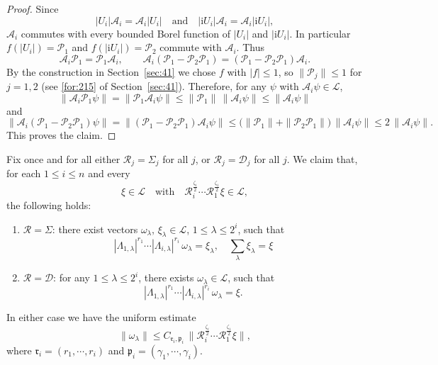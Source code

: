\documentclass[11 pt]{amsart}
\theoremstyle{definition}
\numberwithin{equation}{section}
\begin{document}
\begin{proof} Since
\[
  |U_i|\mathcal A_i = \mathcal A_i |U_i|\quad\text{and}\quad  |\textrm{i}U_i|\mathcal A_i = \mathcal A_i |\textrm{i}U_i|,
\]
$\mathcal A_i$ commutes with every bounded Borel function of $|U_i|$ and $|\textrm{i}U_i|$. In particular $f(|U_i|)=\mathcal P_1$ and $f(|\textrm{i}U_i|)=\mathcal P_2$ commute with $\mathcal A_i$.
Thus
\[
  \mathcal A_i\mathcal{P}_1 = \mathcal{P}_1\mathcal A_i,
  \qquad
  \mathcal A_i(\mathcal{P}_1-\mathcal{P}_2\mathcal{P}_1)
   = (\mathcal{P}_1-\mathcal{P}_2\mathcal{P}_1)\mathcal A_i.
\]
By the construction in Section~\ref{sec:41} we chose $f$ with
$|f|\le1$, so $\|\mathcal{P}_j\|\le1$ for $j=1,2$ (see \eqref{for:215} of Section~\ref{sec:41}). Therefore,
for any $\psi$ with $\mathcal A_i\psi\in\mathcal L$,
\[
  \big\|\mathcal A_i\mathcal{P}_1\psi\big\|
  =\big\|\mathcal{P}_1\mathcal A_i\psi\big\|
  \le\|\mathcal{P}_1\|\,\|\mathcal A_i\psi\|
  \le \|\mathcal A_i\psi\|
\]
and
\[
  \big\|\mathcal A_i(\mathcal{P}_1-\mathcal{P}_2\mathcal{P}_1)\psi\big\|
  =\big\|(\mathcal{P}_1-\mathcal{P}_2\mathcal{P}_1)\mathcal A_i\psi\big\|
  \le \big(\|\mathcal{P}_1\|+\|\mathcal{P}_2\mathcal{P}_1\|\big)\,\|\mathcal A_i\psi\|
  \le 2\,\|\mathcal A_i\psi\|.
\]
This proves the claim.
\end{proof}
Fix once and for all either $\mathcal R_j=\Sigma_j$ for all $j$, or
$\mathcal R_j=\mathcal D_j$ for all $j$.  We claim that, for each $1\le i\le n$ and every
\[
  \xi\in\mathcal L\quad\text{with}\quad
  \mathcal{R}_i^{\frac{\zeta_i}{2}}\cdots\mathcal{R}_1^{\frac{\zeta_1}{2}}\xi\in\mathcal L,
\]
the following holds:
\begin{enumerate}
  \item $\mathcal{R}=\Sigma$: there exist vectors $\omega_{\lambda}, \,\xi_\lambda\in\mathcal L$, $1\le\lambda\le 2^i$, such that
\[
   |\Lambda_{1,\lambda}|^{r_1}\cdots|\Lambda_{i,\lambda}|^{r_i}\,\omega_{\lambda} = \xi_\lambda,\quad \sum_{\lambda}\xi_\lambda=\xi
\]
  \item $\mathcal{R}=\mathcal{D}$: for any $1\le\lambda\le 2^i$, there exists $\omega_{\lambda}\in\mathcal L$, such that
\[
   |\Lambda_{1,\lambda}|^{r_1}\cdots|\Lambda_{i,\lambda}|^{r_i}\,\omega_{\lambda} = \xi.
\]
\end{enumerate}
In either case we have the uniform estimate
\[
  \|\omega_{\lambda}\|\le
  C_{\mathfrak r_i,\mathfrak p_i}\,
  \big\|\mathcal{R}_i^{\frac{\zeta_i}{2}}\cdots\mathcal{R}_1^{\frac{\zeta_1}{2}}\xi\big\|,
\]
where $\mathfrak{r}_i=(r_1,\cdots, r_i)$ and $\mathfrak{p}_i=(\gamma_1,\cdots, \gamma_i)$.
\end{document}

